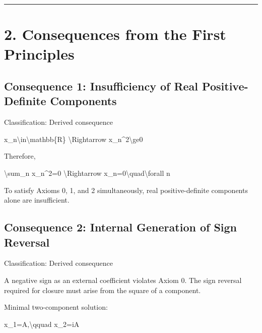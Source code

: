 \documentclass[
  a4paper,
]{article}
\newenvironment{Shaded}{}{}
\newcommand{\NormalTok}[1]{#1}
\begin{document}
\begin{center}\rule{0.5\linewidth}{0.5pt}\end{center}

\section{2. Consequences from the First
Principles}\label{consequences-from-the-first-principles}

\subsection{Consequence 1: Insufficiency of Real Positive-Definite
Components}\label{consequence-1-insufficiency-of-real-positive-definite-components}

Classification: Derived consequence

\begin{Shaded}
\begin{Highlighting}[]
\NormalTok{x\_n\textbackslash{}in\textbackslash{}mathbb\{R\}}
\NormalTok{\textbackslash{}Rightarrow}
\NormalTok{x\_n\^{}2\textbackslash{}ge0}
\end{Highlighting}
\end{Shaded}

Therefore,

\begin{Shaded}
\begin{Highlighting}[]
\NormalTok{\textbackslash{}sum\_n x\_n\^{}2=0}
\NormalTok{\textbackslash{}Rightarrow}
\NormalTok{x\_n=0\textbackslash{}quad\textbackslash{}forall n}
\end{Highlighting}
\end{Shaded}

To satisfy Axioms 0, 1, and 2 simultaneously, real positive-definite
components alone are insufficient.

\subsection{Consequence 2: Internal Generation of Sign
Reversal}\label{consequence-2-internal-generation-of-sign-reversal}

Classification: Derived consequence

A negative sign as an external coefficient violates Axiom 0. The sign
reversal required for closure must arise from the square of a component.

Minimal two-component solution:

\begin{Shaded}
\begin{Highlighting}[]
\NormalTok{x\_1=A,\textbackslash{}qquad x\_2=iA}
\end{Highlighting}
\end{Shaded}
\end{document}
